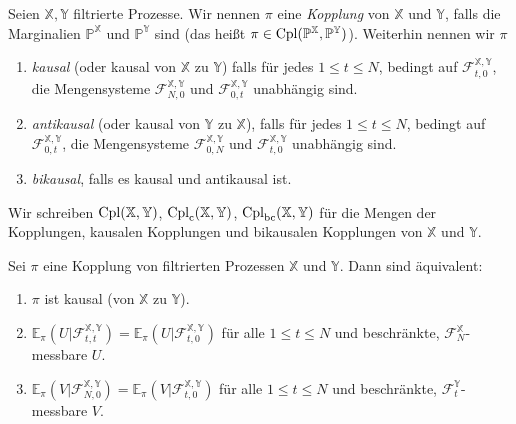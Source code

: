 \begin{definition}
Seien $\mathbb{X}, \mathbb{Y}$ filtrierte Prozesse. Wir nennen $\pi$ eine \emph{Kopplung} von $\mathbb{X}$ und $\mathbb{Y}$, falls die Marginalien $\mathbb{P}^\mathbb{X}$ und $\mathbb{P}^\mathbb{Y}$ sind (das heißt $\pi \in \operatorname{Cpl}(\mathbb{P}^\mathbb{X}, \mathbb{P}^\mathbb{Y})$). Weiterhin nennen wir $\pi$
\begin{enumerate}
\item \emph{kausal} (oder kausal von $\mathbb{X}$ zu $\mathbb{Y}$) falls für jedes $1\leq t\leq N$, bedingt auf $\mathcal{F}_{t, 0}^{\mathbb{X}, \mathbb{Y}}$, die Mengensysteme $\mathcal{F}_{N, 0}^{\mathbb{X}, \mathbb{Y}}$ und $\mathcal{F}_{0, t}^{\mathbb{X},\mathbb{Y}}$ unabhängig sind.
\item \emph{antikausal} (oder kausal von $\mathbb{Y}$ zu $\mathbb{X}$), falls für jedes $1 \leq t \leq N$, bedingt auf $\mathcal{F}_{0, t}^{\mathbb{X}, \mathbb{Y}}$, die Mengensysteme $\mathcal{F}_{0, N}^{\mathbb{X}, \mathbb{Y}}$ und $\mathcal{F}_{t, 0}^{\mathbb{X}, \mathbb{Y}}$ unabhängig sind.
\item \emph{bikausal}, falls es kausal und antikausal ist.
\end{enumerate}
Wir schreiben $\operatorname{Cpl}(\mathbb{X}, \mathbb{Y})$, $\operatorname{Cpl}_{\operatorname{c}}(\mathbb{X}, \mathbb{Y})$, $\operatorname{Cpl}_{\operatorname{bc}}(\mathbb{X}, \mathbb{Y})$ für die Mengen der Kopplungen, kausalen Kopplungen und bikausalen Kopplungen von $\mathbb{X}$ und $\mathbb{Y}$.
\end{definition}
\begin{lemma}\label{thm:causality_characterization}
Sei $\pi$ eine Kopplung von filtrierten Prozessen $\mathbb{X}$ und $\mathbb{Y}$. Dann sind äquivalent:
\begin{enumerate}
\item $\pi$ ist kausal (von $\mathbb{X}$ zu $\mathbb{Y}$).
\item $\mathbb{E}_\pi(U \vert \mathcal{F}_{t, t}^{\mathbb{X}, \mathbb{Y}}) = \mathbb{E}_\pi(U \vert \mathcal{F}_{t, 0}^{\mathbb{X}, \mathbb{Y}})$ für alle $1\leq t\leq N$ und beschränkte, $\mathcal{F}_N^\mathbb{X}$-messbare $U$.
\item $\mathbb{E}_\pi(V\vert \mathcal{F}_{N, 0}^{\mathbb{X}, \mathbb{Y}}) = \mathbb{E}_\pi(V \vert \mathcal{F}_{t, 0}^{\mathbb{X}, \mathbb{Y}})$ für alle $1\leq t\leq N$ und beschränkte, $\mathcal{F}_t^\mathbb{Y}$-messbare $V$.
\end{enumerate}
\end{lemma}